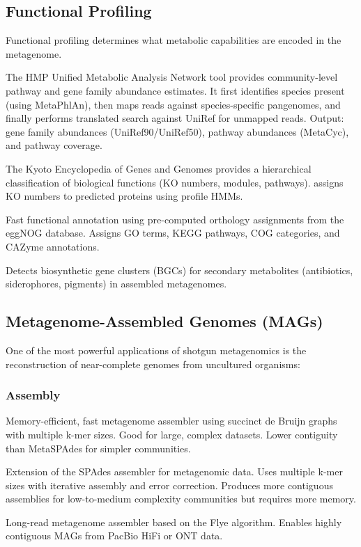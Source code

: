 \subsection{Functional Profiling}

Functional profiling determines what metabolic capabilities are encoded in the metagenome.

\begin{description}[style=nextline]
  \item[HUMAnN 3] The HMP Unified Metabolic Analysis Network tool provides community-level pathway and gene family abundance estimates. It first identifies species present (using MetaPhlAn), then maps reads against species-specific pangenomes, and finally performs translated search against UniRef for unmapped reads. Output: gene family abundances (UniRef90/UniRef50), pathway abundances (MetaCyc), and pathway coverage.
  \item[KEGG / KOfam] The Kyoto Encyclopedia of Genes and Genomes provides a hierarchical classification of biological functions (KO numbers, modules, pathways).  assigns KO numbers to predicted proteins using profile HMMs.
  \item[eggNOG-mapper] Fast functional annotation using pre-computed orthology assignments from the eggNOG database. Assigns GO terms, KEGG pathways, COG categories, and CAZyme annotations.
  \item[antiSMASH] Detects biosynthetic gene clusters (BGCs) for secondary metabolites (antibiotics, siderophores, pigments) in assembled metagenomes.
\end{description}

\subsection{Metagenome-Assembled Genomes (MAGs)}

One of the most powerful applications of shotgun metagenomics is the reconstruction of near-complete genomes from uncultured organisms:

\subsubsection{Assembly}

\begin{description}[style=nextline]
  \item[MEGAHIT] Memory-efficient, fast metagenome assembler using succinct de Bruijn graphs with multiple k-mer sizes. Good for large, complex datasets. Lower contiguity than MetaSPAdes for simpler communities.
  \item[MetaSPAdes] Extension of the SPAdes assembler for metagenomic data. Uses multiple k-mer sizes with iterative assembly and error correction. Produces more contiguous assemblies for low-to-medium complexity communities but requires more memory.
  \item[metaFlye] Long-read metagenome assembler based on the Flye algorithm. Enables highly contiguous MAGs from PacBio HiFi or ONT data.
\end{description}

